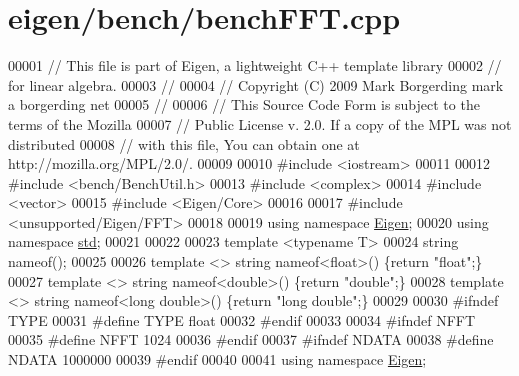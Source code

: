 \hypertarget{eigen_2bench_2bench_f_f_t_8cpp_source}{}\section{eigen/bench/bench\+F\+FT.cpp}
\label{eigen_2bench_2bench_f_f_t_8cpp_source}

\begin{DoxyCode}
00001 \textcolor{comment}{// This file is part of Eigen, a lightweight C++ template library}
00002 \textcolor{comment}{// for linear algebra.}
00003 \textcolor{comment}{//}
00004 \textcolor{comment}{// Copyright (C) 2009 Mark Borgerding mark a borgerding net}
00005 \textcolor{comment}{//}
00006 \textcolor{comment}{// This Source Code Form is subject to the terms of the Mozilla}
00007 \textcolor{comment}{// Public License v. 2.0. If a copy of the MPL was not distributed}
00008 \textcolor{comment}{// with this file, You can obtain one at http://mozilla.org/MPL/2.0/.}
00009 
00010 \textcolor{preprocessor}{#include <iostream>}
00011 
00012 \textcolor{preprocessor}{#include <bench/BenchUtil.h>}
00013 \textcolor{preprocessor}{#include <complex>}
00014 \textcolor{preprocessor}{#include <vector>}
00015 \textcolor{preprocessor}{#include <Eigen/Core>}
00016 
00017 \textcolor{preprocessor}{#include <unsupported/Eigen/FFT>}
00018 
00019 \textcolor{keyword}{using namespace }\hyperlink{namespace_eigen}{Eigen};
00020 \textcolor{keyword}{using namespace }\hyperlink{namespacestd}{std};
00021 
00022 
00023 \textcolor{keyword}{template} <\textcolor{keyword}{typename} T>
00024 \textcolor{keywordtype}{string} nameof();
00025 
00026 \textcolor{keyword}{template} <> \textcolor{keywordtype}{string} nameof<float>() \{\textcolor{keywordflow}{return} \textcolor{stringliteral}{"float"};\}
00027 \textcolor{keyword}{template} <> \textcolor{keywordtype}{string} nameof<double>() \{\textcolor{keywordflow}{return} \textcolor{stringliteral}{"double"};\}
00028 \textcolor{keyword}{template} <> \textcolor{keywordtype}{string} nameof<long double>() \{\textcolor{keywordflow}{return} \textcolor{stringliteral}{"long double"};\}
00029 
00030 \textcolor{preprocessor}{#ifndef TYPE}
00031 \textcolor{preprocessor}{#define TYPE float}
00032 \textcolor{preprocessor}{#endif}
00033 
00034 \textcolor{preprocessor}{#ifndef NFFT}
00035 \textcolor{preprocessor}{#define NFFT 1024}
00036 \textcolor{preprocessor}{#endif}
00037 \textcolor{preprocessor}{#ifndef NDATA}
00038 \textcolor{preprocessor}{#define NDATA 1000000}
00039 \textcolor{preprocessor}{#endif}
00040 
00041 \textcolor{keyword}{using namespace }\hyperlink{namespace_eigen}{Eigen};

\end{DoxyCode}
